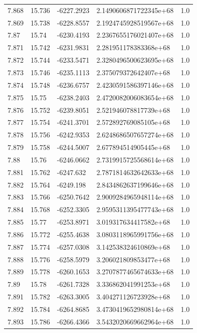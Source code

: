 \begin{tabular}{lllll}
7.868 & 15.736 & -6227.2923 & 2.1490606871722345e+68 & 1.0 \\
7.869 & 15.738 & -6228.8557 & 2.1924745928519567e+68 & 1.0 \\
7.87 & 15.74 & -6230.4193 & 2.2367655176021407e+68 & 1.0 \\
7.871 & 15.742 & -6231.9831 & 2.281951178383368e+68 & 1.0 \\
7.872 & 15.744 & -6233.5471 & 2.3280496500623695e+68 & 1.0 \\
7.873 & 15.746 & -6235.1113 & 2.375079372642407e+68 & 1.0 \\
7.874 & 15.748 & -6236.6757 & 2.4230591586397146e+68 & 1.0 \\
7.875 & 15.75 & -6238.2403 & 2.4720082006083654e+68 & 1.0 \\
7.876 & 15.752 & -6239.8051 & 2.521946078817739e+68 & 1.0 \\
7.877 & 15.754 & -6241.3701 & 2.572892769085105e+68 & 1.0 \\
7.878 & 15.756 & -6242.9353 & 2.6248686507657274e+68 & 1.0 \\
7.879 & 15.758 & -6244.5007 & 2.677894514905445e+68 & 1.0 \\
7.88 & 15.76 & -6246.0662 & 2.7319915725568614e+68 & 1.0 \\
7.881 & 15.762 & -6247.632 & 2.7871814632642633e+68 & 1.0 \\
7.882 & 15.764 & -6249.198 & 2.8434862637199646e+68 & 1.0 \\
7.883 & 15.766 & -6250.7642 & 2.9009284965948114e+68 & 1.0 \\
7.884 & 15.768 & -6252.3305 & 2.9595311395477743e+68 & 1.0 \\
7.885 & 15.77 & -6253.8971 & 3.019317634417582e+68 & 1.0 \\
7.886 & 15.772 & -6255.4638 & 3.0803118965991756e+68 & 1.0 \\
7.887 & 15.774 & -6257.0308 & 3.142538324610869e+68 & 1.0 \\
7.888 & 15.776 & -6258.5979 & 3.206021809853477e+68 & 1.0 \\
7.889 & 15.778 & -6260.1653 & 3.2707877465674633e+68 & 1.0 \\
7.89 & 15.78 & -6261.7328 & 3.336862041991253e+68 & 1.0 \\
7.891 & 15.782 & -6263.3005 & 3.404271126723928e+68 & 1.0 \\
7.892 & 15.784 & -6264.8685 & 3.4730419652980814e+68 & 1.0 \\
7.893 & 15.786 & -6266.4366 & 3.5432020669662964e+68 & 1.0 \\

\end{tabular}
